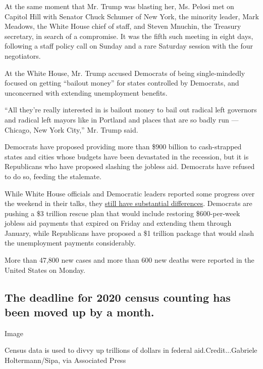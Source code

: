At the same moment that Mr. Trump was blasting her, Ms. Pelosi met on
Capitol Hill with Senator Chuck Schumer of New York, the minority
leader, Mark Meadows, the White House chief of staff, and Steven
Mnuchin, the Treasury secretary, in search of a compromise. It was the
fifth such meeting in eight days, following a staff policy call on
Sunday and a rare Saturday session with the four negotiators.

At the White House, Mr. Trump accused Democrats of being single-mindedly
focused on getting ``bailout money'' for states controlled by Democrats,
and unconcerned with extending unemployment benefits.

``All they're really interested in is bailout money to bail out radical
left governors and radical left mayors like in Portland and places that
are so badly run --- Chicago, New York City,'' Mr. Trump said.

Democrats have proposed providing more than \$900 billion to
cash-strapped states and cities whose budgets have been devastated in
the recession, but it is Republicans who have proposed slashing the
jobless aid. Democrats have refused to do so, feeding the stalemate.

While White House officials and Democratic leaders reported some
progress over the weekend in their talks, they
\href{https://www.nytimes3xbfgragh.onion/2020/08/02/us/politics/coronavirus-jobless-aid.html}{still
have substantial differences}. Democrats are pushing a \$3 trillion
rescue plan that would include restoring \$600-per-week jobless aid
payments that expired on Friday and extending them through January,
while Republicans have proposed a \$1 trillion package that would slash
the unemployment payments considerably.

More than 47,800 new cases and more than 600 new deaths were reported in
the United States on Monday.

\hypertarget{the-deadline-for-2020-census-counting-has-been-moved-up-by-a-month}{%
\subsection{The deadline for 2020 census counting has been moved up by a
month.}\label{the-deadline-for-2020-census-counting-has-been-moved-up-by-a-month}}

Image

Census data is used to divvy up trillions of dollars in federal
aid.Credit...Gabriele Holtermann/Sipa, via Associated Press

